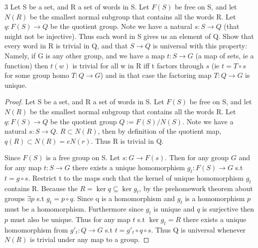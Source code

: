 \documentclass{article}
\begin{document}
\begin{PROB}{3}\label{Problem 3.}
    Let S be a set, and R a set of words in S. Let $F(S)$ be free on S, and let $N(R)$ be the smallest normal subgroup that contains all the words R.  Let $q: F(S) \to Q$ be the quotient group.  Note we have a natural $s: S \to Q$ (that might not be injective). Thus each word in S gives us an element of Q. Show that every word in R is trivial in Q, and that $S \to Q$ is universal with this property: Namely, if G is any other group, and we have a map $t: S \to G$ (a map of sets, ie a function) then $t(w)$ is trivial for all w in R iff t factors through $s$ (ie  $t = T \circ s$ for some group homo $T:Q \to G$) and in that case the factoring map $T: Q \to G$ is unique.
\end{PROB}
\begin{proof}
    Let S be a set, and R a set of words in S. Let $F(S)$ be free on S, and let $N(R)$ be the smallest normal subgroup that contains all the words R.  Let $q: F(S) \to Q$ be the quotient group $Q := F(S)/N(S)$.  Note we have a natural $s: S \to Q$. $R \subset N(R)$, then by definition of the quotient map, $q(R) \subset N(R) = eN(r)$. Thus R is trivial in Q.

    Since $F(S)$ is a free group on S. Let $s: G \to F(s)$. Then for any group $G$ and for any map $t: S \to G$ there exists a unique homomorphism $g_t: F(S) \to G$ s.t $t = g \circ s$. Restrict t to the maps such that the kernel of unique homomorphism $g_t$ contains R. Because the $ R = \ker q \subseteq \ker g_t$, by the prehomework theorem about groups $\exists p$ s.t $g_t = p \circ q$. Since q is a homomorphism and $g_t$ is a homomorphism $p$ must be a homomorphism. Furthermore since $g_t$ is unique and $q$ is surjective then $p$ must also be unique. Thus for any map $t$ s.t $\ker g_t = R$ there exists a unique homomorphism from $g'_{t}: Q \to G$ s.t $t = g'_{t} \circ q \circ s $. Thus Q is universal whenever $N(R)$ is trivial under any map to a group. 
\end{proof}

\bigskip
\end{document}
